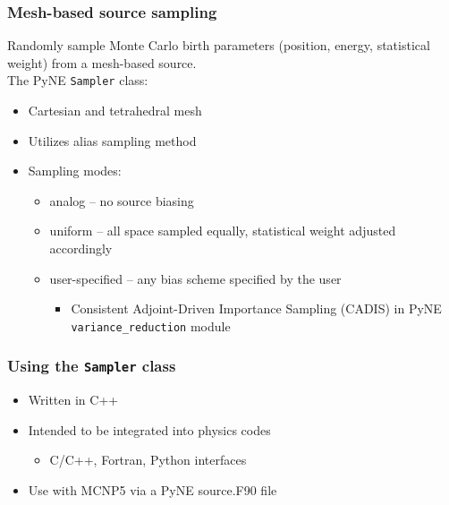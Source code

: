 \documentclass[xcolor=x11names,compress]{beamer}
\begin{document}
\begin{frame}
\frametitle{Mesh-based source sampling}

Randomly sample Monte Carlo birth parameters (position, energy, statistical weight) from a mesh-based source.\\
\vspace{0.3cm}
The PyNE \texttt{Sampler} class:
\begin{itemize}
\item{Cartesian and tetrahedral mesh}
\item{Utilizes alias sampling method \cite{smith_analysis_2005}}
\item{Sampling modes:}
  \begin{itemize}
  \item{analog -- no source biasing}
  \item{uniform -- all space sampled equally, statistical weight adjusted accordingly}
  \item{user-specified -- any bias scheme specified by the user}
    \begin{itemize}
    \item{Consistent Adjoint-Driven Importance Sampling (CADIS) \cite{haghighat_monte_2003} in PyNE \texttt{variance\_reduction} module}
    \end{itemize}
  \end{itemize}
\end{itemize}
\end{frame}

\begin{frame}
\frametitle{Using the \texttt{Sampler} class}
\Large
\begin{itemize}
\item{Written in C++}
\item{Intended to be integrated into physics codes}
  \begin{itemize}
    \large
    \item{C/C++, Fortran, Python interfaces}
  \end{itemize}
\item{Use with MCNP5 via a PyNE source.F90 file}
\end{itemize}
\end{frame}
\end{document}
